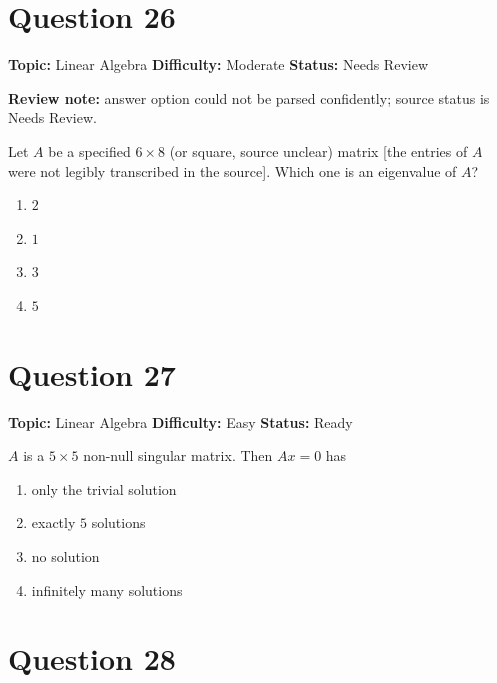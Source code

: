 \documentclass[11pt]{article}
\begin{document}
\newpage

\section*{Question 26}


\noindent\textbf{Topic:} Linear Algebra \quad \textbf{Difficulty:} Moderate \quad \textbf{Status:} Needs Review

\par\noindent\textcolor{StatAmber}{\textbf{Review note:} answer option could not be parsed confidently; source status is Needs Review.}


Let $A$ be a specified $6 \times 8$ (or square, source unclear) matrix [the entries of $A$ were
not legibly transcribed in the source]. Which one is an eigenvalue of $A$?
\begin{enumerate}[label=(\Alph*)]
\item $2$
\item $1$
\item $3$
\item $5$
\end{enumerate}

\newpage

\section*{Question 27}


\noindent\textbf{Topic:} Linear Algebra \quad \textbf{Difficulty:} Easy \quad \textbf{Status:} Ready



$A$ is a $5\times 5$ non-null singular matrix. Then $Ax = 0$ has
\begin{enumerate}[label=(\Alph*)]
\item only the trivial solution
\item exactly $5$ solutions
\item no solution
\item infinitely many solutions
\end{enumerate}

\newpage

\section*{Question 28}

\end{document}
